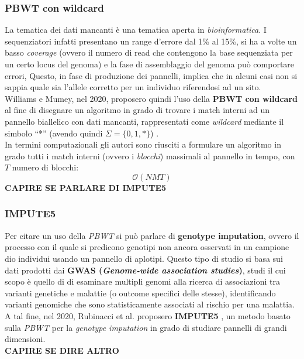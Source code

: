 \subsubsection{PBWT con wildcard}
La tematica dei dati mancanti è una tematica aperta in
\textit{bioinformatica}. I sequenziatori infatti presentano un range d'errore
dal 1\% al 15\%, si ha a volte un basso \textit{coverage} (ovvero il numero di
read che contengono la base sequenziata per un certo locus del genoma) e la fase
di assemblaggio del genoma può comportare errori, Questo, in fase di produzione
dei pannelli, implica che in alcuni casi non si sappia quale sia l'allele
corretto per un individuo riferendosi ad un sito. \\
Williams e Mumey, nel 2020, proposero quindi l'uso della \textbf{PBWT con
  wildcard} al fine di disegnare un algoritmo in grado di trovare i match
interni ad un pannello biallelico con dati mancanti, rappresentati come
\textit{wildcard} mediante il simbolo ``*'' (avendo quindi $\Sigma=\{0,1,*\}$)
\cite{williams}. \\
In termini computazionali gli autori sono riusciti a formulare un algoritmo in
grado tutti i match interni (ovvero i \textit{blocchi}) massimali al pannello in
tempo, con $T$ numero di blocchi: 
\[\mathcal{O}(NMT)\]
\textbf{CAPIRE SE PARLARE DI IMPUTE5}
\subsubsection{IMPUTE5}
Per citare un uso della \textit{PBWT} si può parlare di \textbf{genotype
  imputation}, ovvero il processo con il quale si predicono genotipi non ancora
osservati in un campione dio individui usando un pannello di aplotipi. Questo
tipo di studio si basa sui dati prodotti dai \textbf{GWAS (\textit{Genome-wide
    association studies})}, studi il cui scopo è quello di di esaminare multipli
genomi alla ricerca di associazioni tra varianti genetiche e malattie (o
outcome specifici delle stesse), identificando varianti genomiche che sono
statisticamente associati al rischio per una malattia.\\ 
A tal fine, nel 2020, Rubinacci et al. proposero \textbf{IMPUTE5}
\cite{impute5}, un metodo basato sulla \textit{PBWT} per la \textit{genotype
  imputation} in grado di studiare pannelli di grandi dimensioni.\\
\textbf{CAPIRE SE DIRE ALTRO}
